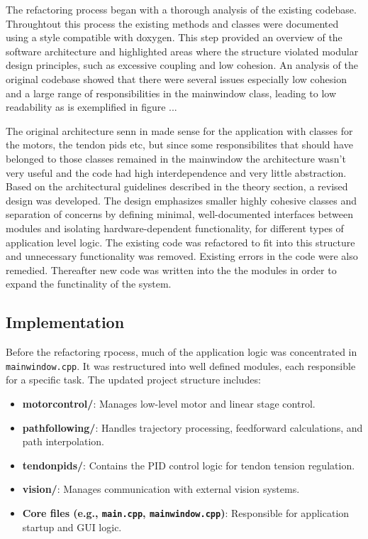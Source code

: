 The refactoring process began with a thorough analysis of the existing codebase. Throughtout this process the existing methods and classes were documented using a style compatible with doxygen. This step provided an overview of the software architecture and highlighted areas where the structure violated modular design principles, such as excessive coupling and low cohesion.
\newline \newline
An analysis of the original codebase showed that there were several issues especially low cohesion and a large range of responsibilities in the mainwindow class, leading to low readability as is exemplified in figure ...




The original architecture senn in  made sense for the application with classes for the motors, the tendon pids etc, but since some responsibilites that should have belonged to those classes remained in the mainwindow the architecture wasn't very useful and the code had high interdependence and very little abstraction.
Based on the architectural guidelines described in the theory section, a revised design was developed. The design emphasizes smaller highly cohesive classes and separation of concerns by defining minimal, well-documented interfaces between modules and isolating hardware-dependent functionality, for different types of application level logic. The existing code was refactored to fit into this structure and unnecessary functionality was removed. Existing errors in the code were also remedied. Thereafter new code was written into the the modules in order to expand the functinality of the system.

\subsection{Implementation}
Before the refactoring rpocess, much of the application logic was concentrated in \texttt{mainwindow.cpp}. It was restructured into well defined modules, each responsible for a specific task. The updated project structure includes:
\begin{itemize}
    \item \textbf{motorcontrol/}: Manages low-level motor and linear stage control.
    \item \textbf{pathfollowing/}: Handles trajectory processing, feedforward calculations, and path interpolation.
    \item \textbf{tendonpids/}: Contains the PID control logic for tendon tension regulation.
    \item \textbf{vision/}: Manages communication with external vision systems.
    \item \textbf{Core files (e.g., \texttt{main.cpp}, \texttt{mainwindow.cpp})}: Responsible for application startup and GUI logic.
\end{itemize}

